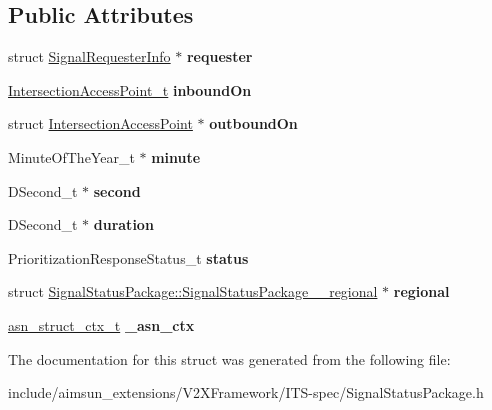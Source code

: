 \subsection*{Public Attributes}
\begin{DoxyCompactItemize}
\item 
struct \hyperlink{structSignalRequesterInfo}{Signal\+Requester\+Info} $\ast$ {\bfseries requester}\hypertarget{structSignalStatusPackage_aa680d222353de55191a457da84a770e9}{}\label{structSignalStatusPackage_aa680d222353de55191a457da84a770e9}

\item 
\hyperlink{structIntersectionAccessPoint}{Intersection\+Access\+Point\+\_\+t} {\bfseries inbound\+On}\hypertarget{structSignalStatusPackage_add75c9c42c9b388dc32d20771142f39e}{}\label{structSignalStatusPackage_add75c9c42c9b388dc32d20771142f39e}

\item 
struct \hyperlink{structIntersectionAccessPoint}{Intersection\+Access\+Point} $\ast$ {\bfseries outbound\+On}\hypertarget{structSignalStatusPackage_a9dbdd05f755904436addb71553782119}{}\label{structSignalStatusPackage_a9dbdd05f755904436addb71553782119}

\item 
Minute\+Of\+The\+Year\+\_\+t $\ast$ {\bfseries minute}\hypertarget{structSignalStatusPackage_a18ba4aa090bdab0276cc6ad45342fee0}{}\label{structSignalStatusPackage_a18ba4aa090bdab0276cc6ad45342fee0}

\item 
D\+Second\+\_\+t $\ast$ {\bfseries second}\hypertarget{structSignalStatusPackage_a76f40caa7c0f7520c77c70a8ba8ad44c}{}\label{structSignalStatusPackage_a76f40caa7c0f7520c77c70a8ba8ad44c}

\item 
D\+Second\+\_\+t $\ast$ {\bfseries duration}\hypertarget{structSignalStatusPackage_ad13a0ca0f5a2efdf8ab4e6649c3ab194}{}\label{structSignalStatusPackage_ad13a0ca0f5a2efdf8ab4e6649c3ab194}

\item 
Prioritization\+Response\+Status\+\_\+t {\bfseries status}\hypertarget{structSignalStatusPackage_a599e0cd96f8c1c8ba54f2615a79776ed}{}\label{structSignalStatusPackage_a599e0cd96f8c1c8ba54f2615a79776ed}

\item 
struct \hyperlink{structSignalStatusPackage_1_1SignalStatusPackage____regional}{Signal\+Status\+Package\+::\+Signal\+Status\+Package\+\_\+\+\_\+regional} $\ast$ {\bfseries regional}\hypertarget{structSignalStatusPackage_a38e8bbd9cd7d50b3f7f57ad49f665c2d}{}\label{structSignalStatusPackage_a38e8bbd9cd7d50b3f7f57ad49f665c2d}

\item 
\hyperlink{structasn__struct__ctx__s}{asn\+\_\+struct\+\_\+ctx\+\_\+t} {\bfseries \+\_\+asn\+\_\+ctx}\hypertarget{structSignalStatusPackage_a473ca66dfcf8d2ed6a0d631d7eb2779b}{}\label{structSignalStatusPackage_a473ca66dfcf8d2ed6a0d631d7eb2779b}

\end{DoxyCompactItemize}


The documentation for this struct was generated from the following file\+:\begin{DoxyCompactItemize}
\item 
include/aimsun\+\_\+extensions/\+V2\+X\+Framework/\+I\+T\+S-\/spec/Signal\+Status\+Package.\+h\end{DoxyCompactItemize}
